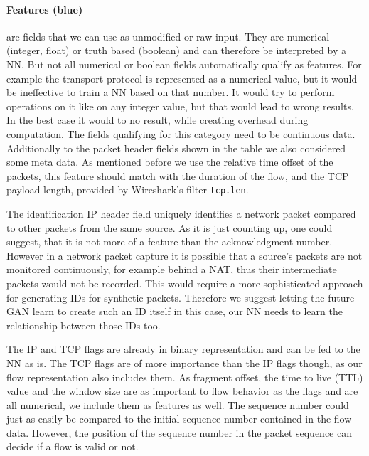 \documentclass[
	ngerman,
	ruledheaders=section,%
	class=report,%
	thesis={type=bachelor},%
	accentcolor=9c,%
	custommargins=true,%
	marginpar=false,%
	parskip=half-,%
	fontsize=11pt,%
	twoside
]{tudapub}
\let\code\texttt
\begin{document}
\paragraph{\colorbox{feature}{\textbf{Features} (blue)}} are fields that we can use as unmodified or raw input.
They are numerical (integer, float) or truth based (boolean) and can therefore be interpreted by a NN.
But not all numerical or boolean fields automatically qualify as features.
For example the transport protocol is represented as a numerical value, but it would be ineffective to train a NN based on that number.
It would try to perform operations on it like on any integer value, but that would lead to wrong results.
In the best case it would to no result, while creating overhead during computation.
The fields qualifying for this category need to be continuous data.
Additionally to the packet header fields shown in the table we also considered some meta data.
As mentioned before we use the relative time offset of the packets, this feature should match with the duration of the flow,
and the TCP payload length, provided by Wireshark's filter \code{tcp.len}.

The identification IP header field uniquely identifies a network packet compared to other packets from the same source.
As it is just counting up, one could suggest, that it is not more of a feature than the acknowledgment number.
However in a network packet capture it is possible that a source's packets are not monitored continuously, for example behind a NAT,
thus their intermediate packets would not be recorded.
This would require a more sophisticated approach for generating IDs for synthetic packets.
Therefore we suggest letting the future GAN learn to create such an ID itself in this case, our NN needs to learn the relationship between those IDs too.

The IP and TCP flags are already in binary representation and can be fed to the NN as is.
The TCP flags are of more importance than the IP flags though, as our flow representation also includes them.
As fragment offset, the time to live (TTL) value and the window size are as important to flow behavior as the flags and are all numerical, we include them as features as well.
The sequence number could just as easily be compared to the initial sequence number contained in the flow data.
However, the position of the sequence number in the packet sequence can decide if a flow is valid or not.
\end{document}
